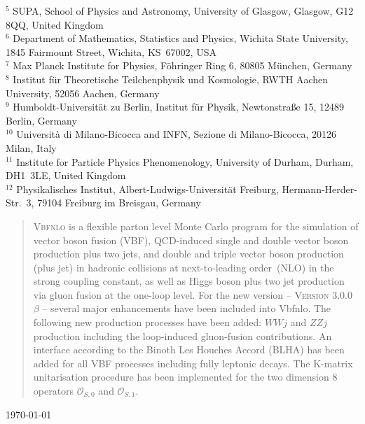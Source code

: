\documentclass[english,12pt]{article}
\begin{document}
\begin{titlepage}
\begin{center}
$^{5}$ SUPA, School of Physics and Astronomy, University of Glasgow, Glasgow, G12 8QQ, United Kingdom \\ \noindent
$^{6}$ Department of Mathematics, Statistics and Physics, Wichita State University, 1845 Fairmount Street, Wichita, KS\ 67002, USA\\ \noindent
$^{7}$ Max Planck Institute for Physics, F\"{o}hringer Ring 6, 80805 M\"{u}nchen, Germany\\ \noindent
$^{8}$ Institut f\"{u}r Theoretische Teilchenphysik und Kosmologie, RWTH Aachen University, 52056 Aachen, Germany  \\ \noindent
$^{9}$ Humboldt-Universit\"{a}t zu Berlin, Institut f\"{u}r Physik, Newtonstra{\ss}e 15, 12489 Berlin, Germany \\ \noindent
$^{10}$ Universit\`a di Milano-Bicocca and INFN, Sezione di Milano-Bicocca, 20126 Milan, Italy\\ \noindent
$^{11}$ Institute for Particle Physics Phenomenology, University of Durham, Durham, DH1~3LE, United Kingdom \\ \noindent
$^{12}$ Physikalisches Institut, Albert-Ludwigs-Universit\"{a}t Freiburg, Hermann-Herder-Str.\ 3, 79104 Freiburg im Breisgau, Germany \\ \noindent
\noindent
\end{center}
\vspace{0.6cm}

\newpage

\begin{abstract}

\noindent
\textsc{Vbfnlo} is a flexible parton level Monte Carlo program for the
simulation of vector boson fusion (VBF), QCD-induced single and double
vector boson production plus two jets, and double and triple vector
boson production (plus jet) in hadronic collisions at next-to-leading
order~(NLO) in the strong coupling constant, as well as Higgs boson plus
two jet production via gluon fusion at the one-loop level.  For the new
version -- \textsc{Version 3.0.0 $\beta$} -- several major enhancements have
been included into {\sc Vbfnlo}.  The following new production processes have been
added: $WWj$ and $ZZj$ production including the loop-induced gluon-fusion
contributions.
An interface according to the Binoth Les Houches Accord (BLHA) has been added
for all VBF processes including fully leptonic decays.
The K-matrix unitarisation procedure has been implemented for the two dimension
8 operators $\mathcal{O}_{S,0}$ and $\mathcal{O}_{S,1}$. 
\end{abstract}
\vspace{2 cm}
\today
\end{titlepage}
\end{document}
